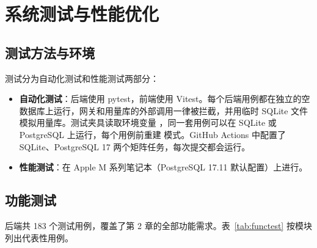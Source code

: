 \section{系统测试与性能优化}

\subsection{测试方法与环境}

测试分为自动化测试和性能测试两部分：
\begin{itemize}
  \item \textbf{自动化测试}：后端使用 pytest，前端使用 Vitest。每个后端用例都在独立的空数据库上运行，网关和用量库的外部调用一律被拦截，并用临时 SQLite 文件模拟用量库。测试夹具读取环境变量 ，同一套用例可以在 SQLite 或 PostgreSQL 上运行，每个用例前重建  模式。GitHub Actions 中配置了 SQLite、PostgreSQL 17 两个矩阵任务，每次提交都会运行。
  \item \textbf{性能测试}：在 Apple M 系列笔记本（PostgreSQL 17.11 默认配置）上进行。
\end{itemize}

\subsection{功能测试}

后端共 183 个测试用例，覆盖了第 2 章的全部功能需求。表~\ref{tab:functest} 按模块列出代表性用例。

